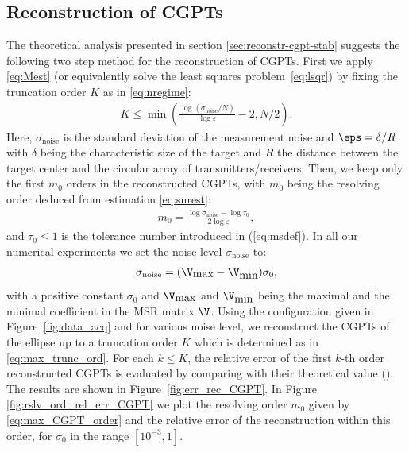 \subsection{Reconstruction of CGPTs}\label{sec:reconstruction-cgpt}
The theoretical analysis presented in section
\ref{sec:reconstr-cgpt-stab} suggests the following two step
method for the reconstruction of CGPTs. First we apply
\eqref{eq:Mest} (or equivalently solve the least squares
problem~\eqref{eq:lsqr}) by fixing the truncation order $K$ as in
\eqref{eq:nregime}:
\begin{align}
  K \leq \min\left ( \frac{\log(\sigma_{\mathrm{noise}}/N)}{\log\varepsilon}-2, N/2\right
  ).
  \label{eq:max_trunc_ord}
\end{align}
Here, $\sigma_{\mathrm{noise}}$ is the standard deviation of the
measurement noise and $\eps = \delta/R$ with $\delta$ being the
characteristic size of the target and $R$ the distance between the
target center and the circular array of transmitters/receivers.
Then, we keep  only the first $m_0$ orders in the reconstructed
CGPTs, with $m_0$ being the resolving order deduced from
estimation \eqref{eq:snrest}:
\begin{align}
  m_0 =
  \frac{\log\sigma_{\mathrm{noise}} - \log \tau_0}{2\log\varepsilon}, \label{eq:max_CGPT_order}
\end{align}
and $\tau_0\leq 1$ is the tolerance number introduced in
(\ref{eq:msdef}). In all our numerical experiments we set the
noise level $\sigma_{\mathrm{noise}}$ to:
\begin{align}
  \label{eq:noise_model}
  \sigma_{\mathrm{noise}} = (\V_{\mbox{max}} -
  \V_{\mbox{min}})\sigma_0,
\end{align}
with a positive constant $\sigma_0$ and $\V_{\mbox{max}}$ and
$\V_{\mbox{min}}$ being the maximal and the minimal coefficient in
the MSR matrix $\V$. Using the configuration given in
Figure~\ref{fig:data_acq} and for various noise level, we
reconstruct the CGPTs of the ellipse up to a truncation order $K$
which is determined as in \eqref{eq:max_trunc_ord}. For each $k
\leq K$, the relative error of the first $k$-th order
reconstructed CGPTs is evaluated by comparing with their
theoretical value (\cite[Proposition
4.7]{ammari2007polarization}). The results are shown in
Figure~\ref{fig:err_rec_CGPT}. In Figure
\ref{fig:rslv_ord_rel_err_CGPT} we plot the resolving order $m_0$
given by \eqref{eq:max_CGPT_order} and the relative error of the
reconstruction within this order, for $\sigma_0$ in the range
$[10^{-3}, 1]$.

